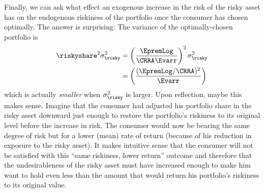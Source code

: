 Finally, we can ask what effect an exogenous increase in the risk of the
risky asset has on the endogenous riskiness of the portfolio once the consumer
has chosen optimally.  The answer is surprising: The variance of the optimally-chosen
portfolio is
\begin{equation}\begin{gathered}\begin{aligned}
\riskyshare^{2} \sigma^{2}_{\risky} & =  \left(\frac{\EpremLog}{\CRRA \Evarr}\right)^{2} \sigma^{2}_{\risky}
\\ & =  \left(\frac{(\EpremLog/\CRRA)^{2}}{\Evarr}\right)
\end{aligned}\end{gathered}\end{equation}
which is actually {\it smaller} when $\sigma^{2}_{\risky}$ is larger.  Upon reflection, maybe this makes sense.  Imagine that the consumer had adjusted his portfolio share in the risky asset downward just enough to restore the portfolio's riskiness to its original level before the increase in risk.  The consumer would now be bearing the same degree of risk but for a lower (mean) rate of return (because of his reduction in exposure to the risky asset).  It makes intuitive sense that the consumer will not be satisfied with this ``same riskiness, lower return'' outcome and therefore that the undesirableness of the risky asset must have increased enough to make him want to hold even less than the amount that would return his portfolio's riskiness to its original value.

